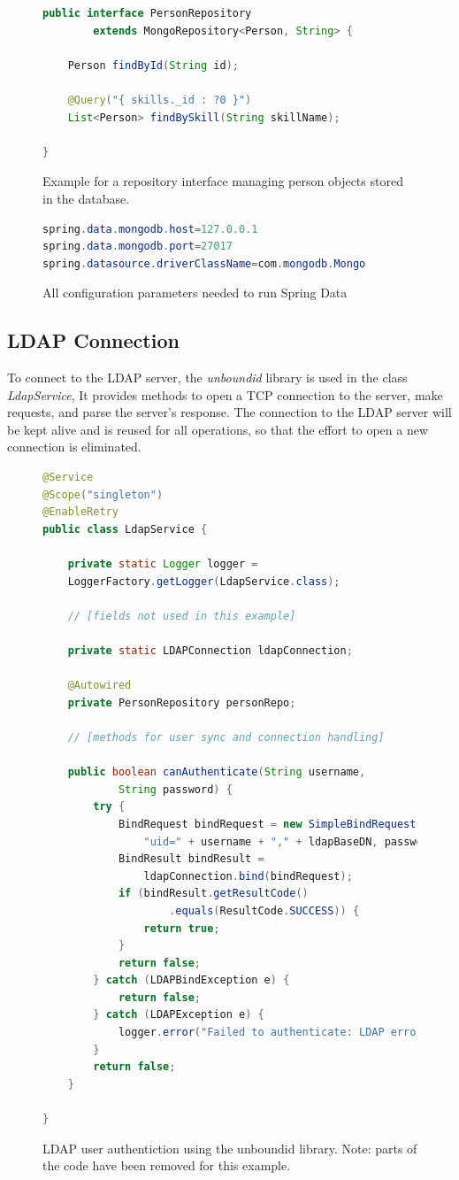\begin{figure}[h]
\begin{lstlisting}[language=Java]
public interface PersonRepository
		extends MongoRepository<Person, String> {

	Person findById(String id);

	@Query("{ skills._id : ?0 }")
	List<Person> findBySkill(String skillName);

}
\end{lstlisting}
\caption[Example Repository Interface]{Example for a repository interface managing person objects stored in the database.}
\end{figure}

\begin{figure}[h]
\begin{lstlisting}[language=Java]
spring.data.mongodb.host=127.0.0.1
spring.data.mongodb.port=27017
spring.datasource.driverClassName=com.mongodb.Mongo
\end{lstlisting}
\caption[Spring Data Config]{All configuration parameters needed to run Spring Data}
\end{figure}

\subsection{LDAP Connection}
To connect to the LDAP server, the \textit{unboundid} library is used in the class \textit{LdapService}, It provides methods to open a TCP connection to the server, make requests, and parse the server's response. The connection to the LDAP server will be kept alive and is reused for all operations, so that the effort to open a new connection is eliminated.

\begin{figure}[H]
\begin{lstlisting}[language=Java]
@Service
@Scope("singleton")
@EnableRetry
public class LdapService {

	private static Logger logger =
    LoggerFactory.getLogger(LdapService.class);

	// [fields not used in this example]

	private static LDAPConnection ldapConnection;

	@Autowired
	private PersonRepository personRepo;

	// [methods for user sync and connection handling]

	public boolean canAuthenticate(String username,
			String password) {
		try {
			BindRequest bindRequest = new SimpleBindRequest(
				"uid=" + username + "," + ldapBaseDN, password);
			BindResult bindResult =
				ldapConnection.bind(bindRequest);
			if (bindResult.getResultCode()
					.equals(ResultCode.SUCCESS)) {
				return true;
			}
			return false;
		} catch (LDAPBindException e) {
			return false;
		} catch (LDAPException e) {
			logger.error("Failed to authenticate: LDAP error");
		}
		return false;
	}

}
\end{lstlisting}
\caption[LDAP User Authentication (Code)]{LDAP user authentiction using the unboundid library. Note: parts of the code have been removed for this example.}
\end{figure}


